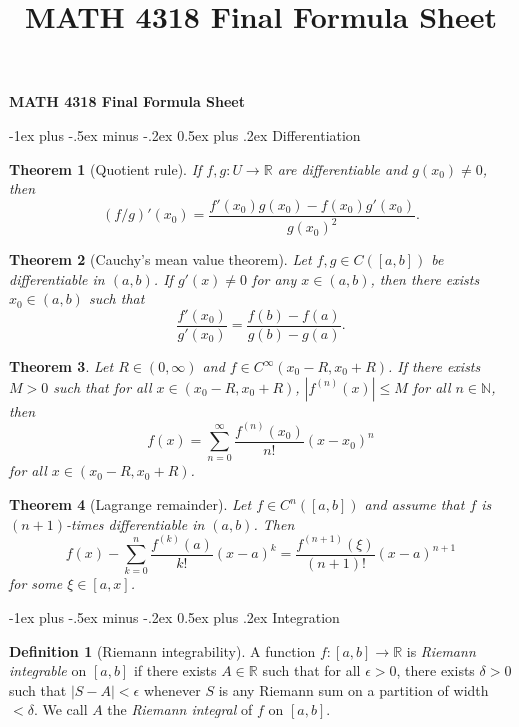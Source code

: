 \documentclass[10pt,landscape]{article}
\title{MATH 4318 Final Formula Sheet}
\makeatletter
\newtheorem{theorem}{Theorem}
\theoremstyle{definition}
\newtheorem{definition}{Definition}
\newcommand{\R}{\mathbb{R}}
\newcommand{\N}{\mathbb{N}}
\renewcommand{\section}{\@startsection{section}{1}{0mm}%
                                {-1ex plus -.5ex minus -.2ex}%
                                {0.5ex plus .2ex}%
                                {\normalfont\large\bfseries}}
\makeatother
\begin{document}
\raggedright
\footnotesize

\begin{center}
     \Large{\textbf{MATH 4318 Final Formula Sheet}} \\
\end{center}
\begin{multicols}{3}
\setlength{\premulticols}{1pt}
\setlength{\postmulticols}{1pt}
\setlength{\multicolsep}{1pt}
\setlength{\columnsep}{2pt}

\section{Differentiation}

\begin{theorem}[Quotient rule]
  If $f, g : U \to \R$ are differentiable and $g(x_0) \ne 0$, then
  \[
    (f / g)'(x_0) = \frac{f'(x_0) g(x_0) - f(x_0) g'(x_0)}{g(x_0)^2}.
  \]
\end{theorem}

\begin{theorem}[Cauchy's mean value theorem]
  Let $f, g \in C([a, b])$ be differentiable in $(a, b)$.
  If $g'(x) \ne 0$ for any $x \in (a, b)$, then there
  exists $x_0 \in (a, b)$ such that
  \[
  \frac{f'(x_0)}{g'(x_0)} = \frac{f(b) - f(a)}{g(b) - g(a)}.
  \]
\end{theorem}

\begin{theorem}
   Let $R \in (0, \infty)$ and
   $f \in C^\infty(x_0 - R, x_0 + R)$. If there
   exists $M > 0$ such that for all $x \in (x_0 - R, x_0 + R)$,
   $|f^{(n)}(x)| \le M$ for all $n \in \N$, then
   \[
     f(x) = \sum_{n = 0}^\infty \frac{f^{(n)}(x_0)}{n!} (x - x_0)^n
   \]
   for all $x \in (x_0 - R, x_0 + R)$.
\end{theorem}

\begin{theorem}[Lagrange remainder]
  Let $f \in C^n([a, b])$ and assume that
  $f$ is $(n + 1)$-times differentiable in $(a, b)$. Then
  \[
    f(x) - \sum_{k = 0}^n \frac{f^{(k)}(a)}{k!} (x - a)^k
    = \frac{f^{(n + 1)}(\xi)}{(n + 1)!} (x - a)^{n + 1}
  \]
  for some $\xi \in [a, x]$.
\end{theorem}

\section{Integration}
\begin{definition}[Riemann integrability]
  A function $f : [a, b] \to \R$ is \emph{Riemann integrable}
  on $[a, b]$ if there exists $A \in \R$ such that for
  all $\epsilon > 0$, there exists $\delta > 0$ such
  that $|S - A| < \epsilon$ whenever $S$ is any
  Riemann sum on a partition of width $< \delta$. We
  call $A$ the \emph{Riemann integral} of $f$ on $[a, b]$.
\end{definition}


\end{multicols}
\end{document}
